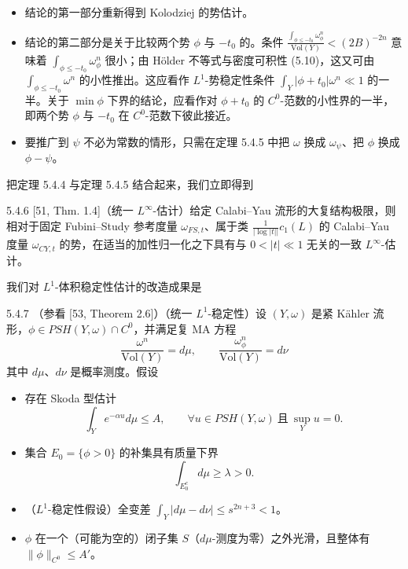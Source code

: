 
\begin{itemize}
\item 结论的第一部分重新得到 Kolodziej 的势估计。
\item 结论的第二部分是关于比较两个势 $\phi$ 与 $-t_0$ 的。条件 $\frac{\int_{\phi\le-t_0}\omega_\phi^n}{\mathrm{Vol}(Y)}<(2B)^{-2n}$ 意味着 $\int_{\phi\le-t_0}\omega_\phi^n$ 很小；由 Hölder 不等式与密度可积性 (5.10)，这又可由 $\int_{\phi\le-t_0}\omega^n$ 的小性推出。这应看作 $L^1$-势稳定性条件 $\int_Y|\phi+t_0|\omega^n\ll1$ 的一半。关于 $\min\phi$ 下界的结论，应看作对 $\phi+t_0$ 的 $C^0$-范数的小性界的一半，即两个势 $\phi$ 与 $-t_0$ 在 $C^0$-范数下彼此接近。
\item 要推广到 $\psi$ 不必为常数的情形，只需在定理 5.4.5 中把 $\omega$ 换成 $\omega_\psi$、把 $\phi$ 换成 $\phi-\psi$。
\end{itemize}

把定理 5.4.4 与定理 5.4.5 结合起来，我们立即得到

\begin{theorem}{5.4.6}
[51, Thm. 1.4]（统一 $L^\infty$-估计）给定 Calabi--Yau 流形的大复结构极限，则相对于固定 Fubini--Study 参考度量 $\omega_{FS,t}$、属于类 $\frac{1}{|\log|t||}c_1(L)$ 的 Calabi--Yau 度量 $\omega_{CY,t}$ 的势，在适当的加性归一化之下具有与 $0<|t|\ll1$ 无关的一致 $L^\infty$-估计。
\end{theorem}

我们对 $L^1$-体积稳定性估计的改造成果是

\begin{theorem}{5.4.7}
（参看 [53, Theorem 2.6]）（统一 $L^1$-稳定性）设 $(Y,\omega)$ 是紧 Kähler 流形，$\phi\in PSH(Y,\omega)\cap C^0$，并满足复 MA 方程
\[
\frac{\omega^n}{\mathrm{Vol}(Y)}=d\mu,\qquad \frac{\omega_\phi^n}{\mathrm{Vol}(Y)}=d\nu
\]
其中 $d\mu$、$d\nu$ 是概率测度。假设
\begin{itemize}
\item 存在 Skoda 型估计
\[
\int_Y e^{-\alpha u}d\mu\le A,\qquad \forall u\in PSH(Y,\omega)\ \text{且}\ \sup_Y u=0.
\]
\item 集合 $E_0=\{\phi>0\}$ 的补集具有质量下界
\[
\int_{E_0^c}d\mu\ge\lambda>0.
\]
\item （$L^1$-稳定性假设）全变差 $\int_Y|d\mu-d\nu|\le s^{2n+3}<1$。
\item $\phi$ 在一个（可能为空的）闭子集 $S$（$d\mu$-测度为零）之外光滑，且整体有 $\|\phi\|_{C^0}\le A'$。
\end{itemize}
\end{theorem}

